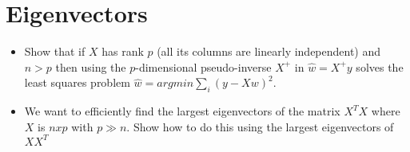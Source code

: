 \section{Eigenvectors}

\begin{itemize}
\item {} 
Show that if $X$ has rank $p$ (all its columns are linearly independent) and $n > p$ 
then using the $p$-dimensional pseudo-inverse $X^+$ in $\hat{w} = X^+ y$ solves the least squares problem
$\hat{w} = argmin \sum_i (y - Xw)^2$.

\item {} 
We want to efficiently find the largest eigenvectors of the matrix $X^TX$ where  $X$ is $n x p$ with $p \gg n$.
Show how to do this using the largest eigenvectors of $XX^T$

\end{itemize}

\PointStats
